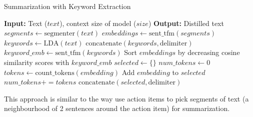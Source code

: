 		\begin{algorithm}
			\caption{Summarization with Keyword Extraction}
			\begin{algorithmic}
				\State \textbf{Input:} Text ($text$), context size of model ($size$)
				\State \textbf{Output:} Distilled text
				\State $segments \leftarrow \text{segmenter}(text)$
				\State $embeddings \leftarrow \text{sent\_tfm}(segments)$
				\State $keywords \leftarrow \text{LDA}(text)$
				\State $\text{concatenate}(keywords, \text{delimiter})$
				\State $keyword\_emb \leftarrow \text{sent\_tfm}(keywords)$
				\State Sort $embeddings$ by decreasing cosine similarity scores with $keyword\_emb$
				\State $selected \leftarrow \{\}$
				\State $num\_tokens \leftarrow 0$
					\State $tokens \leftarrow \text{count\_tokens}(embedding)$
						\State Add $embedding$ to $selected$
						\State $num\_tokens += tokens$
					\EndIf
				\EndFor
				\State $\text{concatenate}(selected, \text{delimiter})$
				\State {}
			\end{algorithmic}
		\end{algorithm}

		This approach is similar to the way \citet{golia2024action} use action items to pick segments
		of text (a neighbourhood of 2 sentences around the action item) for summarization.
